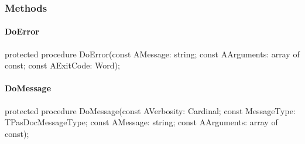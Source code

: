 \documentclass{report}
\newif\ifpdf
\begin{document}
\subsubsection*{\large{\textbf{Methods}}\normalsize\hspace{1ex}\hfill}
\paragraph*{DoError}\hspace*{\fill}

\label{PasDoc_Gen.TDocGenerator-DoError}
\begin{list}{}{
\setlength{\itemindent}{0cm}
\setlength{\listparindent}{0cm}
\setlength{\leftmargin}{\evensidemargin}
\addtolength{\leftmargin}{\tmplength}
\settowidth{\labelsep}{X}
\addtolength{\leftmargin}{\labelsep}
\setlength{\labelwidth}{\tmplength}
}
\item[\textbf{Declaration}\hfill]
\ifpdf
\begin{flushleft}
\fi
\begin{ttfamily}
protected procedure DoError(const AMessage: string; const AArguments: array of const; const AExitCode: Word);\end{ttfamily}

\ifpdf
\end{flushleft}
\fi

\end{list}
\paragraph*{DoMessage}\hspace*{\fill}

\label{PasDoc_Gen.TDocGenerator-DoMessage}
\begin{list}{}{
\setlength{\itemindent}{0cm}
\setlength{\listparindent}{0cm}
\setlength{\leftmargin}{\evensidemargin}
\addtolength{\leftmargin}{\tmplength}
\settowidth{\labelsep}{X}
\addtolength{\leftmargin}{\labelsep}
\setlength{\labelwidth}{\tmplength}
}
\item[\textbf{Declaration}\hfill]
\ifpdf
\begin{flushleft}
\fi
\begin{ttfamily}
protected procedure DoMessage(const AVerbosity: Cardinal; const MessageType: TPasDocMessageType; const AMessage: string; const AArguments: array of const);\end{ttfamily}

\ifpdf
\end{flushleft}
\fi

\end{list}
\end{document}
